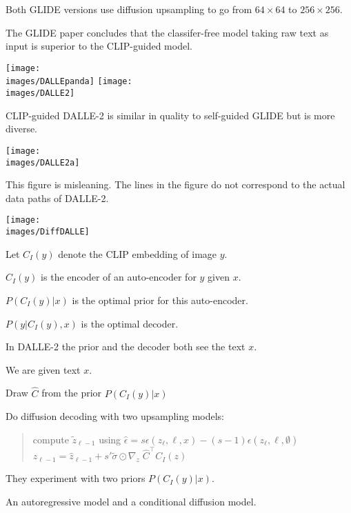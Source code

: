 {

Both GLIDE versions use diffusion upsampling to go from $64 \times 64$ to $256 \times 256$.

\vfill
The GLIDE paper concludes that the classifer-free model taking raw text as input is superior to the CLIP-guided model.


\centerline{\hfill \texttt{[image: \\images/DALLEpanda]} \hfill \texttt{[image: \\images/DALLE2]}}

CLIP-guided DALLE-2 is similar in quality to self-guided GLIDE but is more diverse.


\vfill
\centerline{\texttt{[image: \\images/DALLE2a]}}

This figure is misleaning.  The lines in the figure do not correspond to the actual data paths of DALLE-2.


\centerline{\texttt{[image: \\images/DiffDALLE]}}

\vfill
Let $C_I(y)$ denote the CLIP embedding of image $y$.

\vfill
$C_I(y)$ is the encoder of an auto-encoder for $y$ given $x$.

\vfill
$P(C_I(y)|x)$ is the optimal prior for this auto-encoder.

\vfill
$P(y|C_I(y),x)$ is the optimal decoder.

\vfill
In DALLE-2 the prior and the decoder both see the text $x$.


We are given text $x$.

\vfill
Draw $\hat{C}$ from the prior $P(C_I(y)|x)$

\vfill
Do diffusion decoding with two upsampling models:

\vfill
\begin{quotation}
compute $\tilde{z}_{\ell-1}$ using $\hat{\epsilon} = s\epsilon(z_\ell,\ell,x) - (s-1)\epsilon(z_\ell,\ell,\emptyset)$
\vfill
$z_{\ell-1} = \hat{z}_{\ell-1} + s'\tilde{\sigma}\odot\nabla_z\;\hat{C}^\top C_I(z)$
\end{quotation}


They experiment with two priors $P(C_I(y)|x)$.

\vfill
An autoregressive model and a conditional diffusion model.

}
